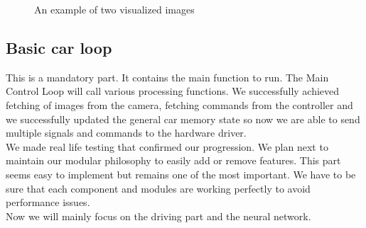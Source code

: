 \documentclass[12pt]{article}
\begin{document}
\begin{figure}[h]
    \centering
    \hfill%
    \caption{An example of two visualized images}
\end{figure}

\newpage

\subsection{Basic car loop}
This is a mandatory part. It contains the main function to run. The Main Control Loop will call various processing functions. We successfully achieved fetching of images from the camera, fetching commands from the controller and we successfully updated the general car memory state so now we are able to send multiple signals and commands to the hardware driver. \\

We made real life testing that confirmed our progression. We plan next to maintain our modular philosophy to easily add or remove features. This part seems easy to implement but remains one of the most important. We have to be sure that each component and modules are working perfectly to avoid performance issues. \\

Now we will mainly focus on the driving part and the neural network.
\end{document}
